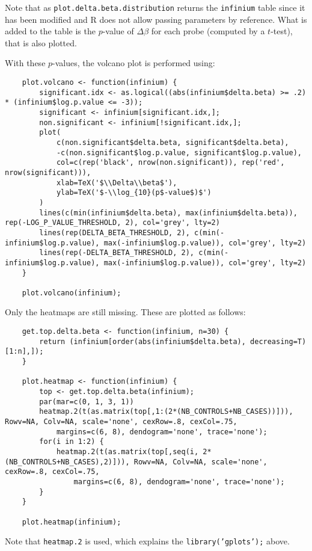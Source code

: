 \documentclass{article}
\begin{document}
Note that as \texttt{plot.delta.beta.distribution} returns the \texttt{infinium} table since it has been modified
and R does not allow passing parameters by reference. What is added to the table is the $p$-value of $\Delta\beta$
for each probe (computed by a $t$-test), that is also plotted.

With these $p$-values, the volcano plot is performed using:
\begin{lstlisting}
	plot.volcano <- function(infinium) {
		significant.idx <- as.logical((abs(infinium$delta.beta) >= .2) * (infinium$log.p.value <= -3));
		significant <- infinium[significant.idx,];
		non.significant <- infinium[!significant.idx,];
		plot(
			c(non.significant$delta.beta, significant$delta.beta),
			-c(non.significant$log.p.value, significant$log.p.value),
			col=c(rep('black', nrow(non.significant)), rep('red', nrow(significant))),
			xlab=TeX('$\\Delta\\beta$'),
			ylab=TeX('$-\\log_{10}(p$-value$)$')
		)
		lines(c(min(infinium$delta.beta), max(infinium$delta.beta)), rep(-LOG_P_VALUE_THRESHOLD, 2), col='grey', lty=2)
		lines(rep(DELTA_BETA_THRESHOLD, 2), c(min(-infinium$log.p.value), max(-infinium$log.p.value)), col='grey', lty=2)
		lines(rep(-DELTA_BETA_THRESHOLD, 2), c(min(-infinium$log.p.value), max(-infinium$log.p.value)), col='grey', lty=2)
	}

	plot.volcano(infinium);
\end{lstlisting}

Only the heatmaps are still missing. These are plotted as follows:
\begin{lstlisting}
	get.top.delta.beta <- function(infinium, n=30) {
		return (infinium[order(abs(infinium$delta.beta), decreasing=T)[1:n],]);
	}

	plot.heatmap <- function(infinium) {
		top <- get.top.delta.beta(infinium);
		par(mar=c(0, 1, 3, 1))
		heatmap.2(t(as.matrix(top[,1:(2*(NB_CONTROLS+NB_CASES))])), Rowv=NA, Colv=NA, scale='none', cexRow=.8, cexCol=.75,
			margins=c(6, 8), dendogram='none', trace='none');
		for(i in 1:2) {
			heatmap.2(t(as.matrix(top[,seq(i, 2*(NB_CONTROLS+NB_CASES),2)])), Rowv=NA, Colv=NA, scale='none', cexRow=.8, cexCol=.75,
				margins=c(6, 8), dendogram='none', trace='none');
		}
	}

	plot.heatmap(infinium);
\end{lstlisting}

Note that \texttt{heatmap.2} is used, which explains the \texttt{library('gplots');} above.

\newpage

{}
\end{document}
